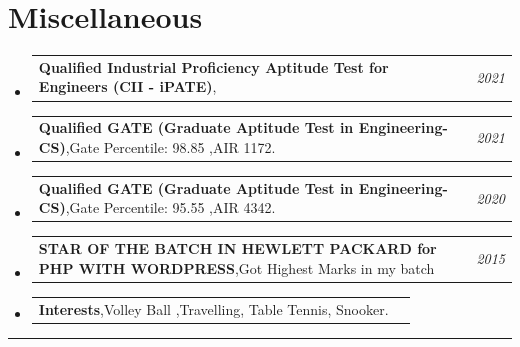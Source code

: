 \documentclass[a4paper,11pt]{article}
\makeatletter
\newcommand{\resumePOR}[3]{
\vspace{0.5mm}\item
    \begin{tabular*}{0.97\textwidth}[t]{l@{\extracolsep{\fill}}r}
        \textbf{#1},\hspace{0.3mm}#2 & \textit{\small{#3}} 
    \end{tabular*}
    \vspace{-2mm}
}
\newcommand{\resumeSubHeadingListStart}{\begin{itemize}[leftmargin=*,labelsep=0mm]}
\newcommand{\resumeSubHeadingListEnd}{\end{itemize}\vspace{2mm}}
\makeatother
\begin{document}
\section{\color{blue}\textbf{Miscellaneous}}
\vspace{-0.1mm}
\resumeSubHeadingListStart
\resumePOR{Qualified Industrial Proficiency Aptitude Test for Engineers (CII - iPATE)} %
{} %
    {2021} %
\resumePOR{Qualified GATE (Graduate Aptitude Test in Engineering-CS)} %
    {Gate Percentile: 98.85 ,AIR 1172.} %
    {2021} %
\vspace{-0.1mm}
\resumePOR{Qualified GATE (Graduate Aptitude Test in Engineering-CS)} %
 {Gate Percentile: 95.55 ,AIR 4342.} %
    {2020} %
\vspace{-0.1mm}
\resumePOR{STAR OF THE BATCH IN HEWLETT PACKARD for PHP WITH WORDPRESS} %
{Got Highest Marks in my batch} %
    {2015} %
\resumePOR{Interests} %
    {Volley Ball ,Travelling, Table Tennis, Snooker.} %
    {} %

    
\vspace{-1.2mm}
\resumeSubHeadingListEnd
\hspace*{-5mm}\rule{1.035\textwidth}{0.1mm}


\end{document}
